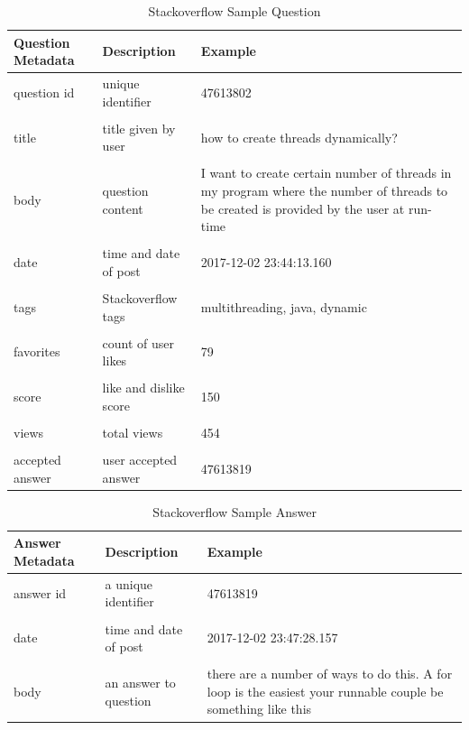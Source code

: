 \begin{table}[t!hb]
\caption{Stackoverflow Sample Question}
\label{questions}
\centering
\begin{tabular}{p{1.7in}p{1.5in}p{2.5in}} \hline
\textbf{Question Metadata} & \textbf{Description} & \textbf{Example}\\ \hline
question id & unique identifier & 47613802\\ 
\\
title & title given by user & how to create threads dynamically? \\
\\
body & question content & I want to create certain number of threads in my program where the number of threads to be created is provided by the user at run-time\\
\\
date & time and date of post & 2017-12-02 23:44:13.160\\ 
\\
tags & Stackoverflow tags & multithreading, java, dynamic\\
\\
favorites & count of user likes & 79\\ 
\\
score & like and dislike score & 150\\
\\
views & total views & 454\\
\\
accepted answer & user accepted answer & 47613819 \\ \hline
\end{tabular}
\end{table}


\begin{table}[b!ht]
\caption{Stackoverflow Sample Answer}
\label{answers}
\centering
\begin{tabular}{p{1.7in}p{1.5in}p{2.5in}} \hline
\textbf{Answer Metadata} & \textbf{Description} & \textbf{Example}\\\hline
answer id & a unique identifier & 47613819 \\ 
\\
date & time and date of post & 2017-12-02 23:47:28.157 \\
\\
body & an answer to question & there are a number of ways to do this. A for loop is the easiest your runnable couple be something like this\\ \hline
\end{tabular}
\end{table}


